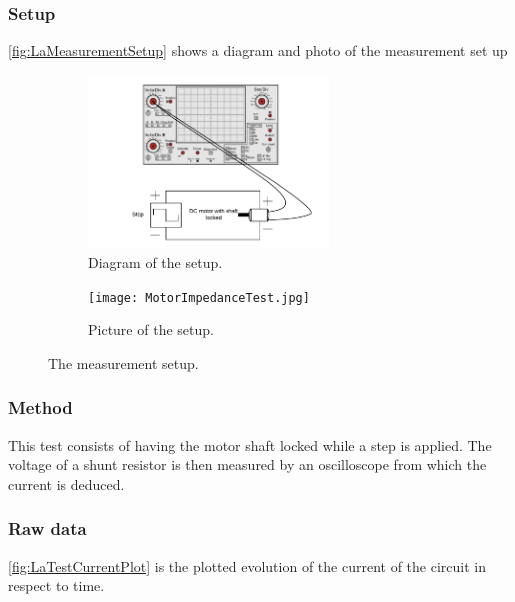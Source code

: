 \subsubsection*{Setup}
\autoref{fig:LaMeasurementSetup} shows a diagram and photo of the measurement set up
\begin{figure}[htbp]
	\centering
	\begin{subfigure}{0.50\textwidth}
		\includegraphics[width=0.7\textwidth]{figures/appendix/Motor&GearTests/LmDiagram}
		\caption{Diagram of the setup.} \label{fig:LaMeasurementDiagram}
	\end{subfigure}
	\begin{subfigure}{0.40\textwidth}
		\texttt{[image: MotorImpedanceTest.jpg]}
		\caption{Picture of the setup.} \label{fig:LaMeasurementPictures}
	\end{subfigure}
	\caption{The measurement setup.} \label{fig:LaMeasurementSetup}   
\end{figure}

\subsubsection*{Method}
This test consists of having the motor shaft locked while a step is applied. The voltage of a shunt resistor is then measured by an oscilloscope from which the current is deduced.
\subsubsection*{Raw data}
\autoref{fig:LaTestCurrentPlot} is the plotted evolution of the current of the circuit in respect to time.



